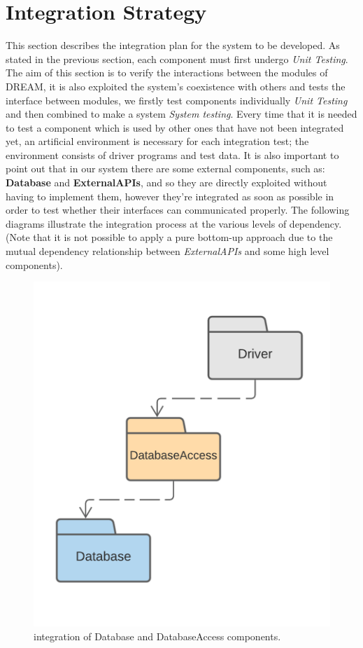 \section{Integration Strategy}

This section describes the integration plan for the system to be developed. As stated in the previous section, each component must first undergo \textit{Unit Testing}.
The aim of this section is to verify the interactions between the modules of DREAM, it is also exploited the system's coexistence with others and tests the interface between modules, we firstly test components individually \textit{Unit Testing} and then combined to make a system \textit{System testing}.
Every time that it is needed to test a component which is used by other ones that have not been integrated yet, an artificial environment is necessary for each integration test; the environment consists of driver programs and test data.
It is also important to point out that in our system there are some external components, such as: \textbf{Database} and \textbf{ExternalAPIs}, and so they are directly exploited without having to implement them, however they're integrated as soon as possible in order to test whether their interfaces can communicated properly.
The following diagrams illustrate the integration process at the various levels of dependency.
(Note that it is not possible to apply a pure bottom-up approach due to the mutual dependency relationship between \textit{ExternalAPIs} and some high level components).
\begin{center}
    \begin{figure}[h!]
  \includegraphics[width=\textwidth,height=\textheight,keepaspectratio]{./Images/IntegrationStrategy/IT1.png}
  \caption{integration of Database and DatabaseAccess components.}
\end{figure}
\end{center}


